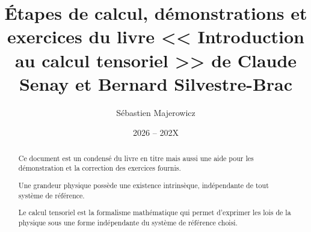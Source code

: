 \documentclass[12pt,a4paper]{report}
\title{\'Etapes de calcul, d\'emonstrations et exercices du livre << Introduction au calcul tensoriel >> de Claude Senay et Bernard Silvestre-Brac}
\author{S\'ebastien Majerowicz}
\date{2026 -- 202X}
\begin{document}
\maketitle

\begin{abstract}
	Ce document est un condens\'{e} du livre en titre mais aussi une aide pour les d\'{e}monstration et la correction des exercices fournis.

	Une grandeur physique poss\`{e}de une existence intrins\`{e}que, ind\'{e}pendante de tout syst\`{e}me de r\'{e}f\'{e}rence.

	Le calcul tensoriel est la formalisme math\'{e}matique qui permet d'exprimer les lois de la physique sous une forme ind\'{e}pendante du syst\`{e}me de r\'{e}f\'{e}rence choisi.
\end{abstract}

\tableofcontents
\listoffigures

\clearpage
{}
\setcounter{page}{1}


\end{document}
